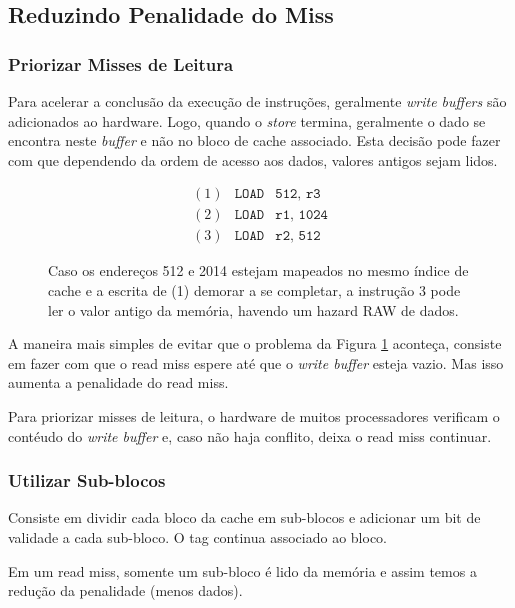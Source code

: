 \subsection{Reduzindo Penalidade do Miss}

\subsubsection{Priorizar Misses de Leitura}
Para acelerar a conclusão da execução de instruções, geralmente \textit{write buffers} são adicionados ao hardware. Logo, quando o \textit{store} termina, geralmente o dado se encontra neste \textit{buffer} e não no bloco de cache associado. Esta decisão pode fazer com que dependendo da ordem de acesso aos dados, valores antigos sejam lidos.

\begin{figure}[H]
  \centering
  \[
    \begin{array}{llll}
      (1) & \texttt{LOAD} & \texttt{512, r3} \\
      (2) & \texttt{LOAD} & \texttt{r1, 1024} \\
      (3) & \texttt{LOAD} & \texttt{r2, 512}
    \end{array}
  \]
  \caption{Caso os endereços 512 e 2014 estejam mapeados no mesmo índice de cache e a escrita de (1) demorar a se completar, a instrução 3 pode ler o valor antigo da memória, havendo um hazard RAW de dados.}
  \label{fig:read-miss}
\end{figure}

A maneira mais simples de evitar que o problema da Figura \ref{fig:read-miss} aconteça, consiste em fazer com que o read miss espere até que o \textit{write buffer} esteja vazio. Mas isso aumenta a penalidade do read miss.

Para priorizar misses de leitura, o hardware de muitos processadores verificam o contéudo do \textit{write buffer} e, caso não haja conflito, deixa o read miss continuar.



\subsubsection{Utilizar Sub-blocos}
Consiste em dividir cada bloco da cache em sub-blocos e adicionar um bit de validade a cada sub-bloco. O tag continua associado ao bloco.

Em um read miss, somente um sub-bloco é lido da memória e assim temos a redução da penalidade (menos dados).

